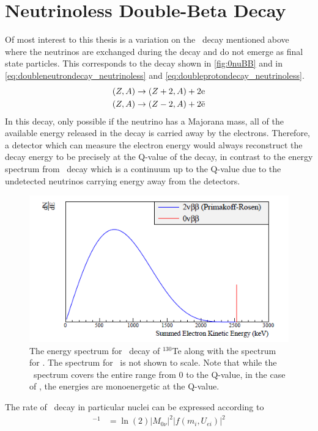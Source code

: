\section{Neutrinoless Double-Beta Decay}
\label{sec:Neutrinoless Double Beta Decay}
Of most interest to this thesis is a variation on the \twonubb~decay mentioned above where the neutrinos are exchanged during the decay and do not emerge as final state particles. This corresponds to the decay shown in \autoref{fig:0nuBB} and in \autoref{eq:doubleneutrondecay_neutrinoless} and \autoref{eq:doubleprotondecay_neutrinoless}.
\begin{align}
    (Z, A) & \rightarrow (Z+2, A)+2\textrm{e} \label{eq:doubleneutrondecay_neutrinoless} \\
    (Z, A) & \rightarrow (Z-2, A)+2\Bar{\textrm{e}} \label{eq:doubleprotondecay_neutrinoless} 
\end{align}
In this decay, only possible if the neutrino has a Majorana mass, all of the available energy released in the decay is carried away by the electrons. Therefore, a detector which can measure the electron energy would always reconstruct the decay energy to be precisely at the Q-value of the decay, in contrast to the energy spectrum from \twonubb~decay which is a continuum up to the Q-value due to the undetected neutrinos carrying energy away from the detectors.
\begin{figure}
    \centering
    \includegraphics[width=0.6\linewidth]{Figures/2nuBBSpectrum.png}
    \caption[The energy spectrum for \twonubb~decay of $^{130}$Te along with the spectrum for \zeronubb.]{The energy spectrum for \twonubb~decay of $^{130}$Te along with the spectrum for \zeronubb. The spectrum for \zeronubb~is not shown to scale. Note that while the \twonubb~spectrum covers the entire range from 0 to the Q-value, in the case of \zeronubb, the energies are monoenergetic at the Q-value.}
    \label{fig:2nuSpectrum}
\end{figure}
The rate of \zeronubb~decay in particular nuclei can be expressed according to 
\begin{align}
    [T^{0\nu}_{1/2}]^{-1}&=\ln(2)|M_{0\nu}|^2|f(m_i,U_{ei})|^2
\end{align}
